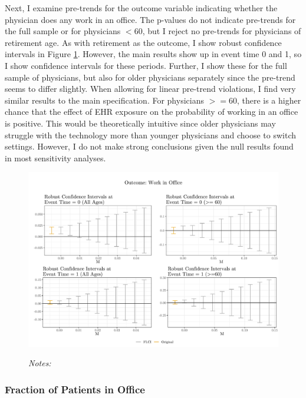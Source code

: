 \documentclass[12pt]{article}
\begin{document}
Next, I examine pre-trends for the outcome variable indicating whether the physician does any work in  an office. The p-values do not indicate pre-trends for the full sample or for physicians $< 60$, but I reject no pre-trends for physicians of retirement age. As with retirement as the outcome, I show robust confidence intervals in Figure \ref{fig:pre_work}. However, the main results show up in event time 0 and 1, so I show confidence intervals for these periods. Further, I show these for the full sample of physicians, but also for older physicians separately since the pre-trend seems to differ slightly. When allowing for linear pre-trend violations, I find very similar results to the main specification. For physicians $>= 60$, there is a higher chance that the effect of EHR exposure on the probability of working in an office is positive. This would be theoretically intuitive since older physicians may struggle with the technology more than younger physicians and choose to switch settings. However, I do not make strong conclusions given the null results found in most sensitivity analyses. 

\begin{figure}[ht]
    \centering
    \captionsetup{width=.5\linewidth}
    \caption{}
    \includegraphics[scale=.5]{Objects/work_pretrends_plot.pdf}
    \label{fig:pre_work}
    \vspace{2mm}
    \caption*{\footnotesize{\textit{Notes:}}}
\end{figure}

\subsubsection{Fraction of Patients in Office}
\end{document}
